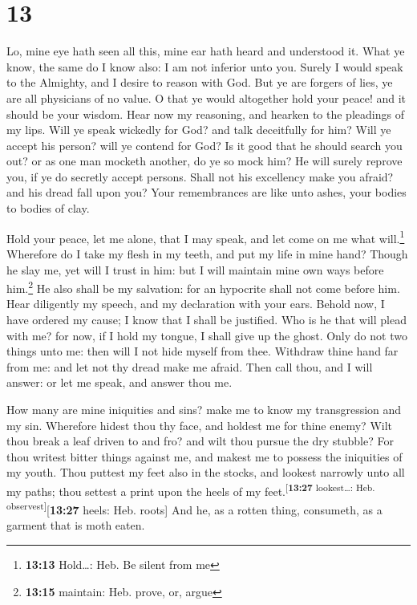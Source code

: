 \hypertarget{section-12}{%
\section{13}\label{section-12}}

 Lo, mine eye hath seen all this, mine ear hath heard and
understood it.  What ye know, the same do I know also: I
am not inferior unto you.  Surely I would speak to the
Almighty, and I desire to reason with God.  But ye are
forgers of lies, ye are all physicians of no value.  O
that ye would altogether hold your peace! and it should be your wisdom.
 Hear now my reasoning, and hearken to the pleadings of my
lips.  Will ye speak wickedly for God? and talk
deceitfully for him?  Will ye accept his person? will ye
contend for God?  Is it good that he should search you
out? or as one man mocketh another, do ye so mock him? 
He will surely reprove you, if ye do secretly accept persons.
 Shall not his excellency make you afraid? and his dread
fall upon you?  Your remembrances are like unto ashes,
your bodies to bodies of clay.

 Hold your peace, let me alone, that I may speak, and let
come on me what will.\footnote{\textbf{13:13} Hold\ldots: Heb. Be silent
  from me}  Wherefore do I take my flesh in my teeth, and
put my life in mine hand?  Though he slay me, yet will I
trust in him: but I will maintain mine own ways before him.\footnote{\textbf{13:15}
  maintain: Heb. prove, or, argue}  He also shall be my
salvation: for an hypocrite shall not come before him. 
Hear diligently my speech, and my declaration with your ears.
 Behold now, I have ordered my cause; I know that I shall
be justified.  Who is he that will plead with me? for
now, if I hold my tongue, I shall give up the ghost. 
Only do not two things unto me: then will I not hide myself from thee.
 Withdraw thine hand far from me: and let not thy dread
make me afraid.  Then call thou, and I will answer: or
let me speak, and answer thou me.

 How many are mine iniquities and sins? make me to know
my transgression and my sin.  Wherefore hidest thou thy
face, and holdest me for thine enemy?  Wilt thou break a
leaf driven to and fro? and wilt thou pursue the dry stubble?
 For thou writest bitter things against me, and makest me
to possess the iniquities of my youth.  Thou puttest my
feet also in the stocks, and lookest narrowly unto all my paths; thou
settest a print upon the heels of my
feet.\textsuperscript{{[}\textbf{13:27} lookest\ldots: Heb.
observest{]}}{[}\textbf{13:27} heels: Heb. roots{]}  And
he, as a rotten thing, consumeth, as a garment that is moth eaten.

